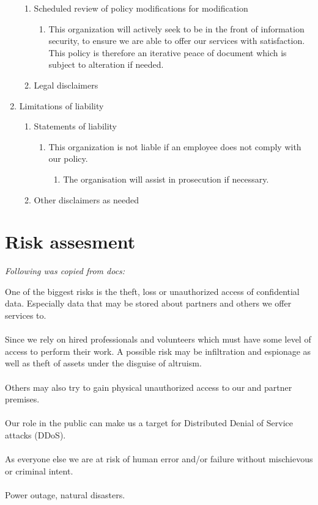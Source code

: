\begin{enumerate}
  \begin{enumerate}
    \item Scheduled review of policy modifications for modification
    \begin{enumerate}
      \item This organization will actively seek to be in the front of information security, to ensure we are able to offer our services with satisfaction. This policy is therefore an iterative peace of document which is subject to alteration if needed.
    \end{enumerate}
    \item Legal disclaimers
  \end{enumerate}
  \item Limitations of liability
  \begin{enumerate}
    \item Statements of liability
    \begin{enumerate}
      \item This organization is not liable if an employee does not comply with our policy.
      \begin{enumerate}
        \item The organisation will assist in prosecution if necessary.
      \end{enumerate}
    \end{enumerate}
    \item Other disclaimers as needed
  \end{enumerate}
\end{enumerate}


\section{Risk assesment}

\textit{Following was copied from docs:}

One of the biggest risks is the theft, loss or unauthorized access of confidential data. Especially data that may be stored about partners and others we offer services to.
\\
\\
Since we rely on hired professionals and volunteers which must have some level of access to perform their work. A possible risk may be infiltration and espionage as well as theft of assets under the disguise of altruism.
\\
\\
Others may also try to gain physical unauthorized access to our and partner premises.
\\
\\
Our role in the public can make us a target for Distributed Denial of Service attacks (DDoS).
\\
\\
As everyone else we are at risk of human error and/or failure without mischievous or criminal intent. 
\\
\\
Power outage, natural disasters.

